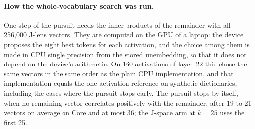 \paragraph{How the whole-vocabulary search was run.} One step of the pursuit needs the inner products of the remainder
with all 256{,}000 J-lens vectors. They are computed on the GPU of a laptop: the device proposes the eight best tokens for
each activation, and the choice among them is made in CPU single precision from the stored unembedding, so that it does not
depend on the device's arithmetic. On 160 activations of layer~22 this chose the same vectors in the same order as the
plain CPU implementation, and that implementation equals the one-activation reference on synthetic dictionaries, including
the cases where the pursuit stops early. The pursuit stops by itself, when no remaining vector correlates positively with
the remainder, after 19 to 21 vectors on average on Core and at most 36; the J-space arm at $k=25$ uses the first 25.
